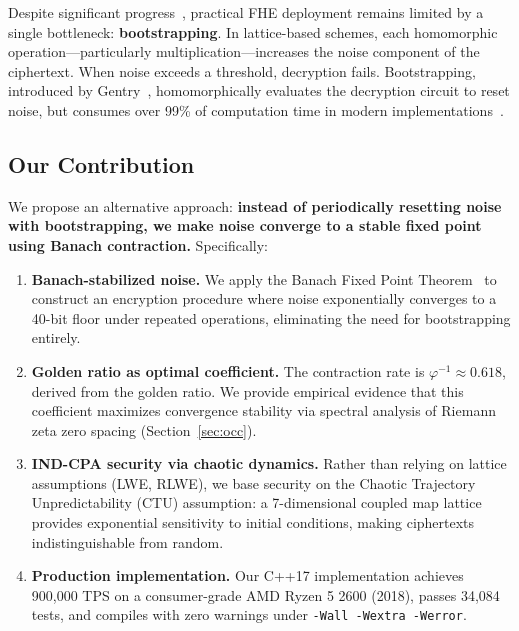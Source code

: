\documentclass[11pt,a4paper]{article}
\begin{document}
Despite significant progress~\cite{brakerski2014,fan2012,cheon2017,chillotti2020}, practical FHE deployment remains limited by a single bottleneck: \textbf{bootstrapping}. In lattice-based schemes, each homomorphic operation---particularly multiplication---increases the noise component of the ciphertext. When noise exceeds a threshold, decryption fails. Bootstrapping, introduced by Gentry~\cite{gentry2009}, homomorphically evaluates the decryption circuit to reset noise, but consumes over 99\% of computation time in modern implementations~\cite{chillotti2020}.

\subsection{Our Contribution}

We propose an alternative approach: \textbf{instead of periodically resetting noise with bootstrapping, we make noise converge to a stable fixed point using Banach contraction.} Specifically:

\begin{enumerate}
    \item \textbf{Banach-stabilized noise.} We apply the Banach Fixed Point Theorem~\cite{banach1922} to construct an encryption procedure where noise exponentially converges to a 40-bit floor under repeated operations, eliminating the need for bootstrapping entirely.
    
    \item \textbf{Golden ratio as optimal coefficient.} The contraction rate is $\varphi^{-1} \approx 0.618$, derived from the golden ratio. We provide empirical evidence that this coefficient maximizes convergence stability via spectral analysis of Riemann zeta zero spacing (Section~\ref{sec:occ}).
    
    \item \textbf{IND-CPA security via chaotic dynamics.} Rather than relying on lattice assumptions (LWE, RLWE), we base security on the Chaotic Trajectory Unpredictability (CTU) assumption: a 7-dimensional coupled map lattice provides exponential sensitivity to initial conditions, making ciphertexts indistinguishable from random.
    
    \item \textbf{Production implementation.} Our C++17 implementation achieves 900,000 TPS on a consumer-grade AMD Ryzen 5 2600 (2018), passes 34,084 tests, and compiles with zero warnings under \texttt{-Wall -Wextra -Werror}.
\end{enumerate}
\end{document}
